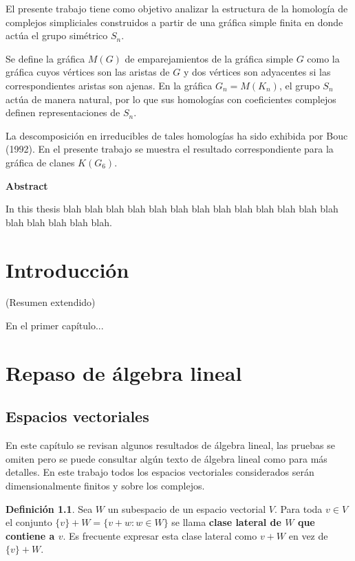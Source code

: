 \documentclass[12pt]{book}
\theoremstyle{definition}
\newtheorem{definition}[theorem]{Definición}
\newcounter{in}
\newcounter{ini}
\begin{document}
El presente trabajo tiene como objetivo analizar la estructura de
la homología de complejos simpliciales construidos a partir de una
gráfica simple finita en donde actúa el grupo simétrico $S_{n}$.

Se define la gráfica $M(G)$ de emparejamientos de la gráfica simple
$G$ como la gráfica cuyos vértices son las aristas de $G$ y dos
vértices son adyacentes si las correspondientes aristas son ajenas. En
la gráfica $G_{n}=M(K_{n})$, el grupo $S_{n}$ actúa de manera natural, por
lo que sus homologías con coeficientes complejos definen
representaciones de $S_{n}$. 

La descomposición en irreducibles de tales homologías ha sido exhibida
por Bouc (1992). En el presente trabajo se muestra el resultado
correspondiente para la gráfica de clanes $K(G_{6})$.

\vspace{2cm}

\begin{flushleft}
  {\bfseries\Large Abstract}
\end{flushleft}

In this thesis blah blah blah blah blah blah blah blah blah
blah blah blah blah blah blah blah blah blah.


\chapter*{Introducción}

(Resumen extendido)

En el primer capítulo...

\tableofcontents


 \newpage \thispagestyle{empty}

\chapter{Repaso de álgebra lineal}
\section{Espacios vectoriales}

En este capítulo se revisan algunos resultados de álgebra lineal, las
pruebas se omiten pero se puede consultar algún texto de álgebra
lineal como \cite{friedberg1982algebra}
  para más  detalles. En este trabajo todos los espacios vectoriales
  considerados serán dimensionalmente finitos y sobre los complejos.

\begin{definition}
  Sea $W$ un subespacio de un espacio vectorial $V$. Para toda $v\in V$ el conjunto $\{v\}+W=\{v+w:w\in W\}$ se
  llama \textbf{clase lateral de $W$ que contiene a $v$}. Es frecuente
  expresar esta clase lateral como $v+W$ en vez de $\{v\}+W$. 
\end{definition}
\end{document}
